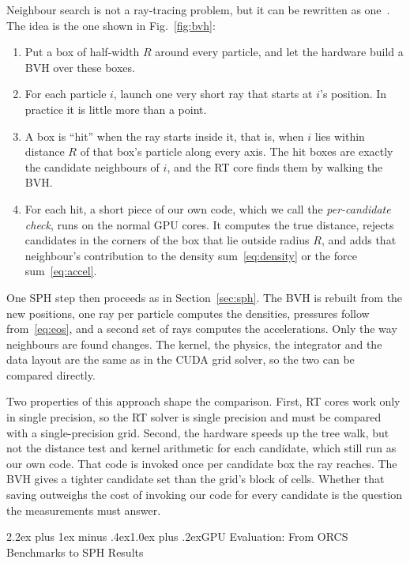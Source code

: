 \documentclass[conference]{IEEEtran}
\makeatletter
\renewcommand\section{\@startsection{section}{1}{\z@}%
  {2.2ex plus 1ex minus .4ex}{1.0ex plus .2ex}{\normalfont\large\bfseries}}
\makeatother
\begin{document}
Neighbour search is not a ray-tracing problem, but it can be rewritten as one~\cite{evangelou2021radius,zhu2022rtnn}. The idea is the one shown in Fig.~\ref{fig:bvh}:
\begin{enumerate}
\item Put a box of half-width $R$ around every particle, and let the hardware build a BVH over these boxes.
\item For each particle $i$, launch one very short ray that starts at $i$'s position. In practice it is little more than a point.
\item A box is ``hit'' when the ray starts inside it, that is, when $i$ lies within distance $R$ of that box's particle along every axis. The hit boxes are exactly the candidate neighbours of $i$, and the RT core finds them by walking the BVH.
\item For each hit, a short piece of our own code, which we call the \emph{per-candidate check}, runs on the normal GPU cores. It computes the true distance, rejects candidates in the corners of the box that lie outside radius $R$, and adds that neighbour's contribution to the density sum~\eqref{eq:density} or the force sum~\eqref{eq:accel}.
\end{enumerate}
One SPH step then proceeds as in Section~\ref{sec:sph}. The BVH is rebuilt from the new positions, one ray per particle computes the densities, pressures follow from~\eqref{eq:eos}, and a second set of rays computes the accelerations. Only the way neighbours are found changes. The kernel, the physics, the integrator and the data layout are the same as in the CUDA grid solver, so the two can be compared directly.

Two properties of this approach shape the comparison. First, RT cores work only in single precision, so the RT solver is single precision and must be compared with a single-precision grid. Second, the hardware speeds up the tree walk, but not the distance test and kernel arithmetic for each candidate, which still run as our own code. That code is invoked once per candidate box the ray reaches. The BVH gives a tighter candidate set than the grid's block of cells. Whether that saving outweighs the cost of invoking our code for every candidate is the question the measurements must answer.

\section{GPU Evaluation: From ORCS Benchmarks to SPH Results}\label{sec:gpuresults}
\end{document}
